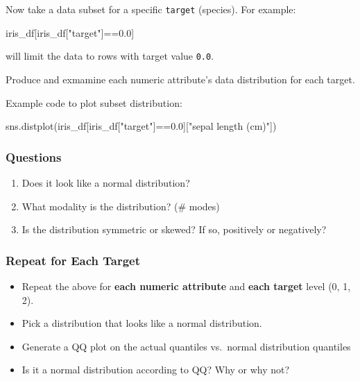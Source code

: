 \documentclass[
  letterpaper,
]{scrbook}
\newenvironment{Shaded}{\begin{snugshade}}{\end{snugshade}}
\newcommand{\FloatTok}[1]{\textcolor[rgb]{0.68,0.00,0.00}{#1}}
\newcommand{\NormalTok}[1]{\textcolor[rgb]{0.00,0.23,0.31}{#1}}
\newcommand{\OperatorTok}[1]{\textcolor[rgb]{0.37,0.37,0.37}{#1}}
\newcommand{\StringTok}[1]{\textcolor[rgb]{0.13,0.47,0.30}{#1}}
\providecommand{\tightlist}{%
  \setlength{\itemsep}{0pt}\setlength{\parskip}{0pt}}
\begin{document}
Now take a data subset for a specific \texttt{target} (species). For
example:

\begin{Shaded}
\begin{Highlighting}[]
\NormalTok{iris\_df[iris\_df[}\StringTok{"target"}\NormalTok{]}\OperatorTok{==}\FloatTok{0.0}\NormalTok{]}
\end{Highlighting}
\end{Shaded}

will limit the data to rows with target value \texttt{0.0}.

Produce and exmamine each numeric attribute's data distribution for each
target.

Example code to plot subset distribution:

\begin{Shaded}
\begin{Highlighting}[]
\NormalTok{sns.distplot(iris\_df[iris\_df[}\StringTok{"target"}\NormalTok{]}\OperatorTok{==}\FloatTok{0.0}\NormalTok{][}\StringTok{"sepal length (cm)"}\NormalTok{])}
\end{Highlighting}
\end{Shaded}

\subsubsection*{Questions}\label{questions-1}

\begin{enumerate}
\def\labelenumi{\arabic{enumi}.}
\tightlist
\item
  Does it look like a normal distribution?
\item
  What modality is the distribution? (\# modes)
\item
  Is the distribution symmetric or skewed? If so, positively or
  negatively?
\end{enumerate}

\subsubsection*{Repeat for Each Target}\label{repeat-for-each-target}

\begin{itemize}
\tightlist
\item
  Repeat the above for \textbf{each numeric attribute} and \textbf{each
  target} level (0, 1, 2).
\item
  Pick a distribution that looks like a normal distribution.
\item
  Generate a QQ plot on the actual quantiles vs.~normal distribution
  quantiles
\item
  Is it a normal distribution according to QQ? Why or why not?
\end{itemize}
\end{document}
